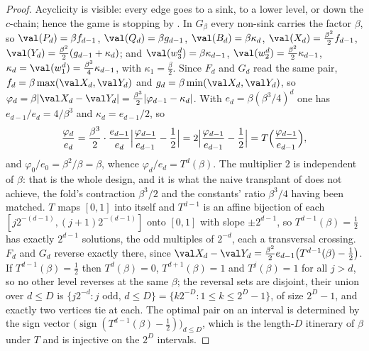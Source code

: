 \begin{proof}
Acyclicity is visible: every edge goes to a sink, to a lower level, or down the
$c$-chain; hence the game is stopping by . In $G_\beta$ every
non-sink carries the factor $\beta$, so
$\val(P_d)=\beta f_{d-1}$, $\val(Q_d)=\beta g_{d-1}$, $\val(B_d)=\beta\kappa_d$,
$\val(X_d)=\tfrac{\beta^{2}}2f_{d-1}$,
$\val(Y_d)=\tfrac{\beta^{2}}2(g_{d-1}+\kappa_d)$; and
$\val(w^{d}_3)=\beta\kappa_{d-1}$,
$\val(w^{d}_2)=\tfrac{\beta^{2}}2\kappa_{d-1}$,
$\kappa_d=\val(w^{d}_1)=\tfrac{\beta^{3}}4\kappa_{d-1}$, with
$\kappa_1=\tfrac{\beta}2$. Since $F_d$ and $G_d$
read the same pair,
$f_d=\beta\max(\val X_d,\val Y_d)$ and $g_d=\beta\min(\val X_d,\val Y_d)$, so
$\varphi_d=\beta|\val X_d-\val Y_d|=\tfrac{\beta^{3}}2|\varphi_{d-1}-\kappa_d|$.
With $e_d=\beta(\beta^{3}/4)^{d}$ one has $e_{d-1}/e_d=4/\beta^{3}$ and
$\kappa_d=e_{d-1}/2$, so
\[
 \frac{\varphi_d}{e_d}=\frac{\beta^{3}}2\cdot\frac{e_{d-1}}{e_d}
   \Bigl|\frac{\varphi_{d-1}}{e_{d-1}}-\frac12\Bigr|
   =2\Bigl|\frac{\varphi_{d-1}}{e_{d-1}}-\frac12\Bigr|
   =T\Bigl(\frac{\varphi_{d-1}}{e_{d-1}}\Bigr),
\]
and $\varphi_0/e_0=\beta^{2}/\beta=\beta$, whence $\varphi_d/e_d=T^{d}(\beta)$.
The multiplier $2$ is independent of $\beta$: that is the whole design, and it
is what the naive transplant of  does not achieve, the fold's
contraction $\beta^{3}/2$ and the constants' ratio $\beta^{3}/4$ having been
matched. $T$ maps $[0,1]$ into itself and $T^{d-1}$ is an affine bijection of
each $[j2^{-(d-1)},(j+1)2^{-(d-1)}]$ onto $[0,1]$ with slope $\pm2^{d-1}$, so
$T^{d-1}(\beta)=\tfrac12$ has exactly $2^{d-1}$ solutions, the odd multiples of
$2^{-d}$, each a transversal crossing. $F_d$ and $G_d$ reverse exactly there,
since $\val X_d-\val Y_d=\tfrac{\beta^{2}}2e_{d-1}\bigl(T^{d-1}(\beta)-\tfrac12\bigr)$.
If $T^{d-1}(\beta)=\tfrac12$ then $T^{d}(\beta)=0$, $T^{d+1}(\beta)=1$ and
$T^{j}(\beta)=1$ for all $j>d$, so no other level reverses at the same $\beta$;
the reversal sets are disjoint, their union over $d\le D$ is
$\{j2^{-d}:j\text{ odd},\,d\le D\}=\{k2^{-D}:1\le k\le2^{D}-1\}$, of size
$2^{D}-1$, and exactly two vertices tie at each. The optimal pair on an interval
is determined by the sign vector $\bigl(\operatorname{sign}(T^{d-1}(\beta)-\tfrac12)
\bigr)_{d\le D}$, which is the length-$D$ itinerary of $\beta$ under $T$ and is
injective on the $2^{D}$ intervals.
\end{proof}

